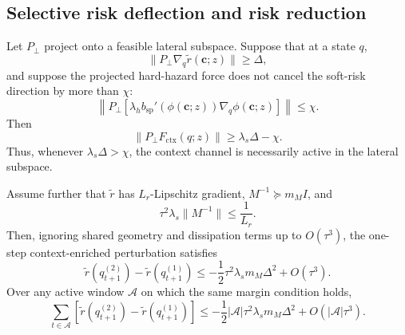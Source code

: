 \subsection{Selective risk deflection and risk reduction}

\begin{theorem}
\label{thm:risk_deflection}
Let \(P_\perp\) project onto a feasible lateral subspace. Suppose that at a state \(q\),
\[
    \|P_\perp\nabla_q\widetilde r(\mathbf c;z)\|\ge \Delta,
\]
and suppose the projected hard-hazard force does not cancel the soft-risk direction by
more than \(\chi\):
\[
    \left\|
    P_\perp
    \left[
    \lambda_h b_{\mathrm{sp}}'(\phi(\mathbf c;z))\nabla_q\phi(\mathbf c;z)
    \right]
    \right\|
    \le \chi.
\]
Then
\[
    \|P_\perp F_{\mathrm{ctx}}(q;z)\|
    \ge
    \lambda_s\Delta-\chi .
\]
Thus, whenever \(\lambda_s\Delta>\chi\), the context channel is necessarily active in
the lateral subspace.

Assume further that \(\widetilde r\) has \(L_r\)-Lipschitz gradient,
\(M^{-1}\succeq m_M I\), and
\[
    \tau^2\lambda_s\|M^{-1}\|\le \frac{1}{L_r}.
\]
Then, ignoring shared geometry and dissipation terms up to \(O(\tau^3)\), the
one-step context-enriched perturbation satisfies
\[
    \widetilde r(q_{t+1}^{(2)})
    -
    \widetilde r(q_{t+1}^{(1)})
    \le
    -\frac12\tau^2\lambda_s m_M \Delta^2
    +
    O(\tau^3).
\]
Over any active window \(\mathcal A\) on which the same margin condition holds,
\[
    \sum_{t\in\mathcal A}
    \left[
    \widetilde r(q_{t+1}^{(2)})
    -
    \widetilde r(q_{t+1}^{(1)})
    \right]
    \le
    -\frac12|\mathcal A|\tau^2\lambda_s m_M \Delta^2
    +
    O(|\mathcal A|\tau^3).
\]
\end{theorem}

